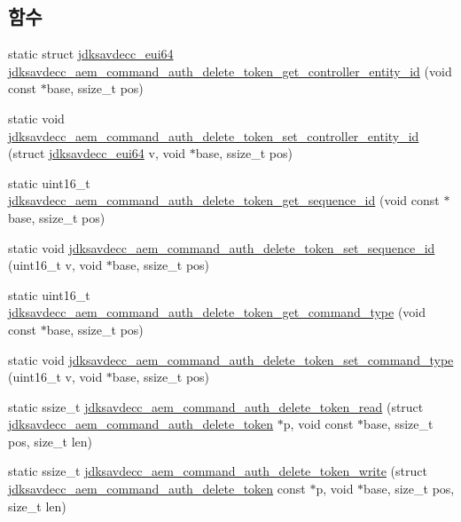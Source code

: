 \subsection*{함수}
\begin{DoxyCompactItemize}
\item 
static struct \hyperlink{structjdksavdecc__eui64}{jdksavdecc\+\_\+eui64} \hyperlink{group__command__auth__delete__token_ga576965d7570d017933b90f9811fca24f}{jdksavdecc\+\_\+aem\+\_\+command\+\_\+auth\+\_\+delete\+\_\+token\+\_\+get\+\_\+controller\+\_\+entity\+\_\+id} (void const $\ast$base, ssize\+\_\+t pos)
\item 
static void \hyperlink{group__command__auth__delete__token_ga67b5fb0699ef590e0b76923b94ac8b44}{jdksavdecc\+\_\+aem\+\_\+command\+\_\+auth\+\_\+delete\+\_\+token\+\_\+set\+\_\+controller\+\_\+entity\+\_\+id} (struct \hyperlink{structjdksavdecc__eui64}{jdksavdecc\+\_\+eui64} v, void $\ast$base, ssize\+\_\+t pos)
\item 
static uint16\+\_\+t \hyperlink{group__command__auth__delete__token_ga959b492b4c2d2635984bafd243fe43ff}{jdksavdecc\+\_\+aem\+\_\+command\+\_\+auth\+\_\+delete\+\_\+token\+\_\+get\+\_\+sequence\+\_\+id} (void const $\ast$base, ssize\+\_\+t pos)
\item 
static void \hyperlink{group__command__auth__delete__token_ga6d53edacd7096028cefd29abe9aa817c}{jdksavdecc\+\_\+aem\+\_\+command\+\_\+auth\+\_\+delete\+\_\+token\+\_\+set\+\_\+sequence\+\_\+id} (uint16\+\_\+t v, void $\ast$base, ssize\+\_\+t pos)
\item 
static uint16\+\_\+t \hyperlink{group__command__auth__delete__token_ga3dd287e9a33fcbc99f5a471ee5a09922}{jdksavdecc\+\_\+aem\+\_\+command\+\_\+auth\+\_\+delete\+\_\+token\+\_\+get\+\_\+command\+\_\+type} (void const $\ast$base, ssize\+\_\+t pos)
\item 
static void \hyperlink{group__command__auth__delete__token_ga1e4c0ce23c415533e0e96d9169b725b5}{jdksavdecc\+\_\+aem\+\_\+command\+\_\+auth\+\_\+delete\+\_\+token\+\_\+set\+\_\+command\+\_\+type} (uint16\+\_\+t v, void $\ast$base, ssize\+\_\+t pos)
\item 
static ssize\+\_\+t \hyperlink{group__command__auth__delete__token_ga8e401a9b92051b495a66c82eea4cb22c}{jdksavdecc\+\_\+aem\+\_\+command\+\_\+auth\+\_\+delete\+\_\+token\+\_\+read} (struct \hyperlink{structjdksavdecc__aem__command__auth__delete__token}{jdksavdecc\+\_\+aem\+\_\+command\+\_\+auth\+\_\+delete\+\_\+token} $\ast$p, void const $\ast$base, ssize\+\_\+t pos, size\+\_\+t len)
\item 
static ssize\+\_\+t \hyperlink{group__command__auth__delete__token_ga995150d53dacdc7efe80e385008d0b0b}{jdksavdecc\+\_\+aem\+\_\+command\+\_\+auth\+\_\+delete\+\_\+token\+\_\+write} (struct \hyperlink{structjdksavdecc__aem__command__auth__delete__token}{jdksavdecc\+\_\+aem\+\_\+command\+\_\+auth\+\_\+delete\+\_\+token} const $\ast$p, void $\ast$base, size\+\_\+t pos, size\+\_\+t len)
\end{DoxyCompactItemize}


